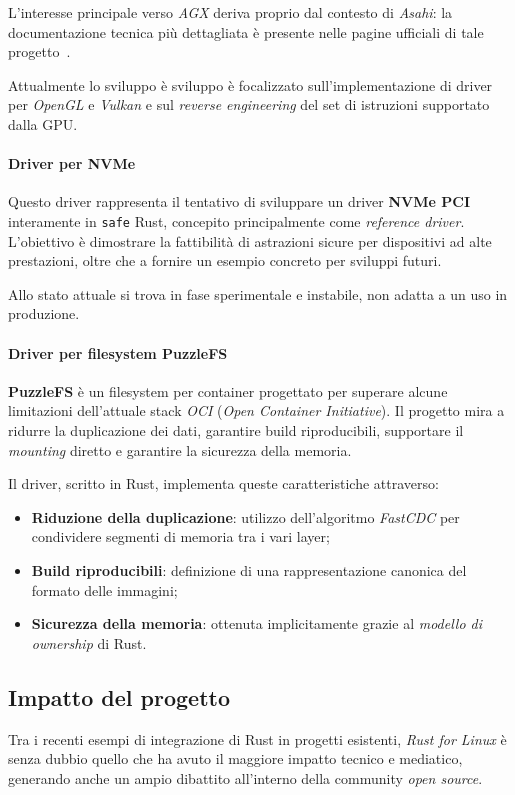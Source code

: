 L'interesse principale verso \textit{AGX} deriva proprio dal contesto di \textit{Asahi}: la documentazione tecnica più dettagliata è presente
nelle pagine ufficiali di tale progetto~\cite{asahi}.

Attualmente lo sviluppo è sviluppo è focalizzato sull'implementazione di driver per \textit{OpenGL} e \textit{Vulkan} e sul \textit{reverse engineering} del set di istruzioni 
supportato dalla GPU.\ 

\paragraph{Driver per NVMe}
Questo driver rappresenta il tentativo di sviluppare un driver \textbf{NVMe PCI} interamente in \texttt{safe} Rust, concepito principalmente come \textit{reference driver}.
L'obiettivo è dimostrare la fattibilità di astrazioni sicure per dispositivi ad alte prestazioni, oltre che a fornire un esempio concreto per sviluppi futuri.

Allo stato attuale si trova in fase sperimentale e instabile, non adatta a un uso in produzione.

\paragraph{Driver per filesystem PuzzleFS}
\textbf{PuzzleFS} è un filesystem per container progettato per superare alcune limitazioni dell'attuale stack \textit{OCI} (\textit{Open Container Initiative}).
Il progetto mira a ridurre la duplicazione dei dati, garantire build riproducibili, supportare il \textit{mounting} diretto e garantire la sicurezza della memoria.

Il driver, scritto in Rust, implementa queste caratteristiche attraverso:
\begin{itemize}
    \item \textbf{Riduzione della duplicazione}: utilizzo dell'algoritmo \textit{FastCDC} per condividere segmenti di memoria tra i vari layer;
    \item \textbf{Build riproducibili}: definizione di una rappresentazione canonica del formato delle immagini;
    \item \textbf{Sicurezza della memoria}: ottenuta implicitamente grazie al \textit{modello di ownership} di Rust.
\end{itemize}

\subsection{Impatto del progetto}
Tra i recenti esempi di integrazione di Rust in progetti esistenti, \textit{Rust for Linux} è senza dubbio quello che ha avuto il maggiore impatto tecnico 
e mediatico, generando anche un ampio dibattito all'interno della community \textit{open source}.

